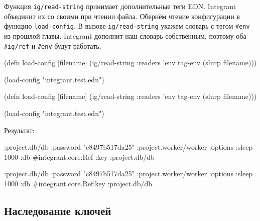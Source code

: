 \fi

Функция \verb|ig/read-string| принимает дополнительные теги EDN. Integrant
объединит их со своими при чтении файла. Обернём чтение конфигурации в функцию
\verb|load-config|. В вызове \verb|ig/read-string| укажем словарь с тегом
\verb|#env| из прошлой главы. Integrant дополнит наш словарь собственным,
поэтому оба \verb|#ig/ref| и \verb|#env| будут работать.

\ifnarrow

\begin{english}
  \begin{clojure}
(defn load-config [filename]
  (ig/read-string
    {:readers {'env tag-env}}
    (slurp filename)))

(load-config "integrant.test.edn")
  \end{clojure}
\end{english}

\else

\begin{english}
  \begin{clojure}
(defn load-config [filename]
  (ig/read-string {:readers {'env tag-env}}
                  (slurp filename)))

(load-config "integrant.test.edn")
  \end{clojure}
\end{english}

\fi

\noindent
Результат:

\ifnarrow

\begin{english}
  \begin{clojure}
{:project.db/db
 {:password "c8497b517da25"}
 :project.worker/worker
 {:options {:sleep 1000}
  :db #integrant.core.Ref
        {:key :project.db/db}}}
  \end{clojure}
\end{english}

\else

\begin{english}
  \begin{clojure}
{:project.db/db {:password "c8497b517da25"}
 :project.worker/worker
 {:options {:sleep 1000}
  :db #integrant.core.Ref{:key :project.db/db}}}
  \end{clojure}
\end{english}

\fi

\subsection{Наследование ключей}

